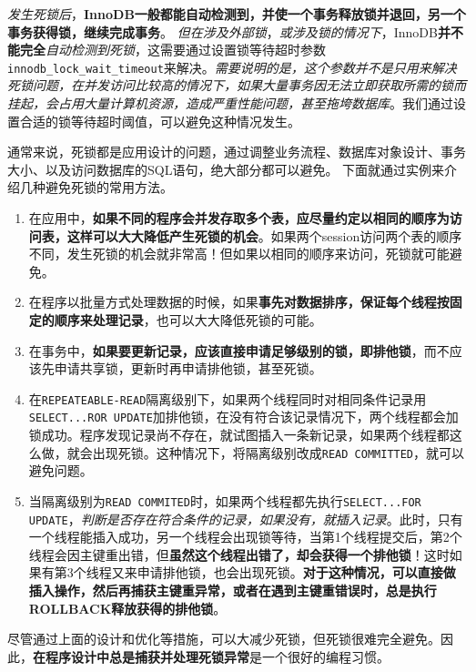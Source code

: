 \documentclass[UTF8,a4paper,12pt]{ctexbook}
\begin{document}
			\textit{发生死锁后}，\textbf{InnoDB一般都能自动检测到，并使一个事务释放锁并退回，另一个事务获得锁，继续完成事务}。	
			\textit{但在涉及外部锁}，\textit{或涉及锁的情况下}，InnoDB\textbf{并不能完全}\textit{自动检测到死锁}，这需要通过设置锁等待超时参数\verb|innodb_lock_wait_timeout|来解决。\textit{需要说明的是，这个参数并不是只用来解决死锁问题，在并发访问比较高的情况下，如果大量事务因无法立即获取所需的锁而挂起，会占用大量计算机资源，造成严重性能问题，甚至拖垮数据库}。我们通过设置合适的锁等待超时阈值，可以避免这种情况发生。
			
			通常来说，死锁都是应用设计的问题，通过调整业务流程、数据库对象设计、事务大小、以及访问数据库的SQL语句，绝大部分都可以避免。
			下面就通过实例来介绍几种避免死锁的常用方法。
			
			
			\begin{enumerate}
				\item 在应用中，\textbf{如果不同的程序会并发存取多个表，应尽量约定以相同的顺序为访问表，这样可以大大降低产生死锁的机会}。如果两个session访问两个表的顺序不同，发生死锁的机会就非常高！但如果以相同的顺序来访问，死锁就可能避免。
				\item 在程序以批量方式处理数据的时候，如果\textbf{事先对数据排序，保证每个线程按固定的顺序来处理记录}，也可以大大降低死锁的可能。
				\item 在事务中，\textbf{如果要更新记录，应该直接申请足够级别的锁，即排他锁}，而不应该先申请共享锁，更新时再申请排他锁，甚至死锁。
				\item 在\verb|REPEATEABLE-READ|隔离级别下，如果两个线程同时对相同条件记录用\verb|SELECT...ROR UPDATE|加排他锁，在没有符合该记录情况下，两个线程都会加锁成功。程序发现记录尚不存在，就试图插入一条新记录，如果两个线程都这么做，就会出现死锁。这种情况下，将隔离级别改成\verb|READ COMMITTED|，就可以避免问题。
				\item 当隔离级别为\verb|READ COMMITED|时，如果两个线程都先执行\verb|SELECT...FOR UPDATE|，\textit{判断是否存在符合条件的记录，如果没有，就插入记录}。此时，只有一个线程能插入成功，另一个线程会出现锁等待，当第1个线程提交后，第2个线程会因主键重出错，但\textbf{虽然这个线程出错了，却会获得一个排他锁}！这时如果有第3个线程又来申请排他锁，也会出现死锁。\textbf{对于这种情况，可以直接做插入操作，然后再捕获主键重异常，或者在遇到主键重错误时，总是执行ROLLBACK释放获得的排他锁}。
			\end{enumerate}
			
			尽管通过上面的设计和优化等措施，可以大减少死锁，但死锁很难完全避免。因此，\textbf{在程序设计中总是捕获并处理死锁异常}是一个很好的编程习惯。
			
\end{document}
